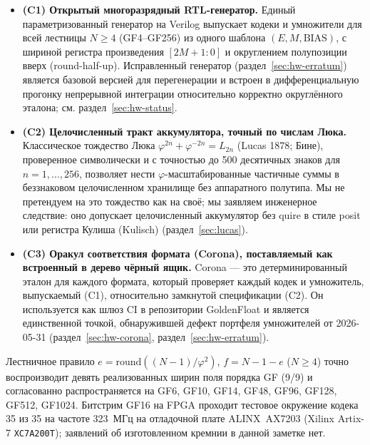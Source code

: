 \documentclass[11pt,a4paper]{article}
\theoremstyle{plain}
\begin{document}
\begin{itemize}\setlength{\itemsep}{2pt}
\item \textbf{(C1) Открытый многоразрядный RTL-генератор.} Единый
параметризованный генератор на Verilog выпускает кодеки и умножители для всей
лестницы \(N \ge 4\) (GF4--GF256) из одного шаблона \((E, M, \mathrm{BIAS})\),
с шириной регистра произведения \([2M+1:0]\) и округлением полупозиции вверх
(round-half-up).
Исправленный генератор (раздел~\ref{sec:hw-erratum}) является базовой версией
для перегенерации и встроен в дифференциальную прогонку непрерывной интеграции
относительно корректно округлённого эталона; см. раздел~\ref{sec:hw-status}.
\item \textbf{(C2) Целочисленный тракт аккумулятора, точный по числам Люка.}
Классическое тождество Люка \(\varphi^{2n} + \varphi^{-2n} = L_{2n}\)
(Lucas 1878; Бине), проверенное символически и с точностью до 500 десятичных
знаков для \(n = 1,\dots,256\), позволяет нести \(\varphi\)-масштабированные
частичные суммы в беззнаковом целочисленном хранилище без аппаратного полутипа.
Мы не претендуем на это тождество как на своё; мы заявляем инженерное
следствие: оно допускает целочисленный аккумулятор без quire в стиле posit
или регистра Кулиша (Kulisch) (раздел~\ref{sec:lucas}).
\item \textbf{(C3) Оракул соответствия формата (Corona), поставляемый как
встроенный в дерево чёрный ящик.} Corona --- это детерминированный эталон для
каждого формата, который проверяет каждый кодек и умножитель, выпускаемый (C1),
относительно замкнутой спецификации (C2). Он используется как шлюз CI в
репозитории GoldenFloat и является единственной точкой, обнаружившей дефект
портфеля умножителей от 2026-05-31 (раздел~\ref{sec:hw-corona},
раздел~\ref{sec:hw-erratum}).
\end{itemize}

Лестничное правило \(e = \mathrm{round}((N-1)/\varphi^{2})\), \(f = N-1-e\)
(\(N \ge 4\)) точно воспроизводит девять реализованных ширин поля порядка GF
(9/9) и согласованно распространяется на GF6, GF10, GF14, GF48, GF96, GF128,
GF512, GF1024. Битстрим GF16 на FPGA
проходит тестовое окружение кодека 35 из 35 на частоте 323~МГц на
отладочной плате ALINX~AX7203 (Xilinx Artix-7 \texttt{XC7A200T}); заявлений об
изготовленном кремнии в данной заметке нет.
\end{document}
